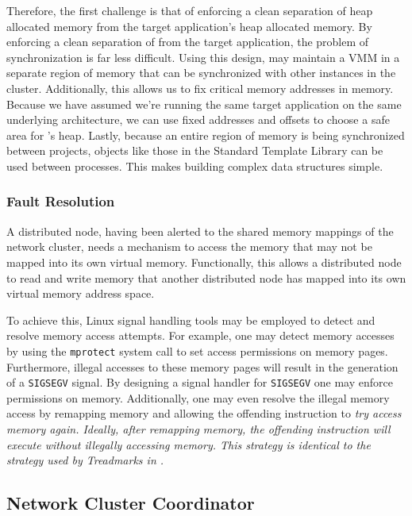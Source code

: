 Therefore, the first challenge is that of enforcing a clean separation of \projname{} heap allocated memory from the target application's heap allocated memory.  By enforcing a clean separation of \projname{} from the target application, the problem of synchronization is far less difficult.  Using this design, \projname{} may maintain a VMM in a separate region of memory that can be synchronized with other \projname{} instances in the cluster.  Additionally, this allows us to fix critical \projname{} memory addresses in memory.  Because we have assumed we're running the same target application on the same underlying architecture, we can use fixed addresses and offsets to choose a safe area for \projname{}'s heap.  Lastly, because an entire region of memory is being synchronized between projects, objects like those in the Standard Template Library can be used between processes.  This makes building complex data structures simple.

\subsubsection{Fault Resolution}

A distributed node, having been alerted to the shared memory mappings of the network cluster, needs a mechanism to access the memory that may not be mapped into its own virtual memory.  Functionally, this allows a distributed node to read and write memory that another distributed node has mapped into its own virtual memory address space.

To achieve this, Linux signal handling tools may be employed to detect and resolve memory access attempts.  For example, one may detect memory accesses by using the \verb,mprotect, system call to set access permissions on memory pages.  Furthermore, illegal accesses to these memory pages will result in the generation of a \verb,SIGSEGV, signal.  By designing a signal handler for \verb,SIGSEGV, one may enforce permissions on memory.  Additionally, one may even resolve the illegal memory access by remapping memory and allowing the offending instruction to \em try \em access memory again.  Ideally, after remapping memory, the offending instruction will execute without illegally accessing memory.  This strategy is identical to the strategy used by Treadmarks in \cite{Keleher:1994:TDS:1267074.1267084}.

\subsection{Network Cluster Coordinator}
\label{network-stack-design}

